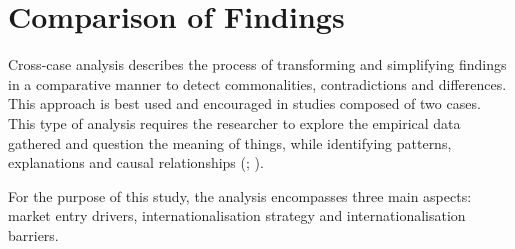 \documentclass[11pt,a4paper]{article}
\begin{document}
{{\section{Comparison of Findings}
\vspace{-2mm}
\label{findings_comparison}
 \par
Cross-case analysis describes the process of transforming and simplifying findings in a comparative manner to detect commonalities, contradictions and differences. This approach is best used and encouraged in studies composed of two cases. This type of analysis requires the researcher to explore the empirical data gathered and question the meaning of things, while identifying patterns, explanations and causal relationships (\cite{cruzesCaseStudiesSynthesis2015}; \cite{yinCaseStudyResearch2017}). \par
For the purpose of this study, the analysis encompasses three main aspects: market entry drivers, internationalisation strategy and internationalisation barriers. 

\vspace{-2mm}
}}
\end{document}
